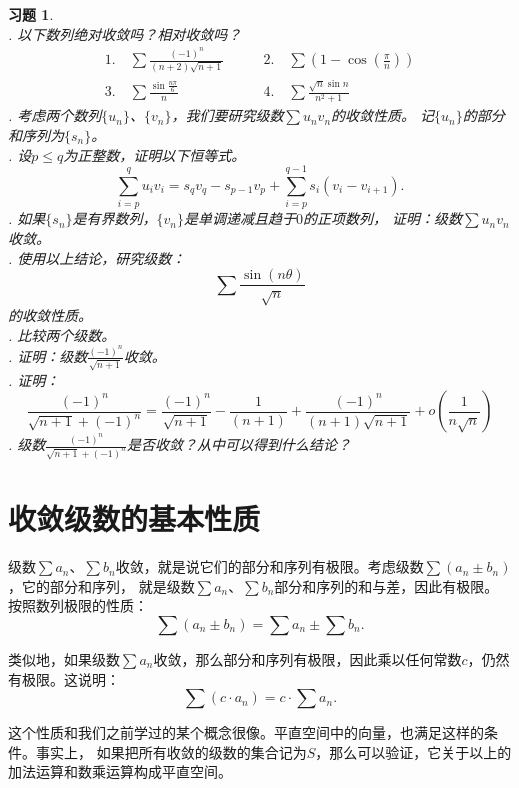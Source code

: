 \documentclass[12pt,UTF8]{ctexbook}
\newcommand{\olim}[1]{\mathit{o}\left(#1\right)}  %
\theoremstyle{definition}
\theoremstyle{plain}
\newtheorem{xt}{习题}[section]
\begin{document}
\begin{xt}
    \mbox{} \\
    . 以下数列绝对收敛吗？相对收敛吗？\\
    $$
    \begin{array}{ll}
        1. \quad \sum \frac{(-1)^n}{(n + 2)\sqrt{n + 1}} \qquad &2. \quad \sum \left(1 - \cos{\left(\frac{\pi}{n}\right)}\right) \\
        3. \quad \sum \frac{\sin{\frac{n\pi}{6}}}{n} \qquad &4. \quad \sum \frac{\sqrt{n}\sin{n}}{n^2 + 1} 
    \end{array}
    $$ 
    . 考虑两个数列$\{u_n\}$、$\{v_n\}$，我们要研究级数$\sum u_n v_n$的收敛性质。
    记$\{u_n\}$的部分和序列为$\{s_n\}$。\\
    . 设$p \leqslant q$为正整数，证明以下恒等式。
    $$ \sum_{i=p}^q u_i v_i = s_q v_q - s_{p-1} v_p + \sum_{i=p}^{q-1} s_i (v_i - v_{i+1}). $$
    . 如果$\{s_n\}$是有界数列，$\{v_n\}$是单调递减且趋于$0$的正项数列，
    证明：级数$\sum u_n v_n$收敛。\\
    . 使用以上结论，研究级数：
    $$ \sum \frac{\sin{(n\theta)}}{\sqrt{n}}$$
    的收敛性质。\\
    . 比较两个级数。\\
    . 证明：级数$\frac{(-1)^n}{\sqrt{n + 1}}$收敛。\\
    . 证明：
    $$\frac{(-1)^n}{\sqrt{n + 1} + (-1)^n} = \frac{(-1)^n}{\sqrt{n + 1}} - \frac{1}{(n + 1)} + \frac{(-1)^n}{(n + 1)\sqrt{n + 1}} + \olim{\frac{1}{n\sqrt{n}}}$$
    . 级数$\frac{(-1)^n}{\sqrt{n + 1} + (-1)^n}$是否收敛？从中可以得到什么结论？
    
\end{xt}

\section{收敛级数的基本性质}

级数$\sum a_n$、$\sum b_n$收敛，就是说它们的部分和序列有极限。考虑级数$\sum (a_n \pm b_n)$，它的部分和序列，
就是级数$\sum a_n$、$\sum b_n$部分和序列的和与差，因此有极限。按照数列极限的性质：
$$\sum (a_n \pm b_n) = \sum a_n \pm \sum b_n.$$

类似地，如果级数$\sum a_n$收敛，那么部分和序列有极限，因此乘以任何常数$c$，仍然有极限。这说明：
$$\sum (c \cdot a_n) = c\cdot \sum a_n.$$

这个性质和我们之前学过的某个概念很像。平直空间中的向量，也满足这样的条件。事实上，
如果把所有收敛的级数的集合记为$S$，那么可以验证，它关于以上的加法运算和数乘运算构成平直空间。
\end{document}
